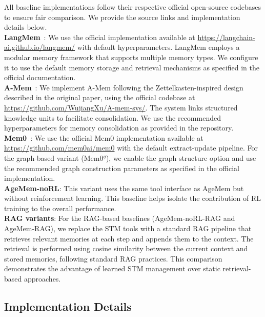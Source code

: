All baseline implementations follow their respective official open-source codebases to ensure fair comparison. We provide the source links and implementation details below.
\\
\textbf{LangMem}~\citep{langmem2025}: We use the official implementation available at \url{https://langchain-ai.github.io/langmem/} with default hyperparameters. LangMem employs a modular memory framework that supports multiple memory types. We configure it to use the default memory storage and retrieval mechanisms as specified in the official documentation.
\\
\textbf{A-Mem}~\citep{xu2025mem}: We implement A-Mem following the Zettelkasten-inspired design described in the original paper, using the official codebase at \url{https://github.com/WujiangXu/A-mem-sys/}. The system links structured knowledge units to facilitate consolidation. We use the recommended hyperparameters for memory consolidation as provided in the repository.
\\
\textbf{Mem0}~\citep{chhikara2025mem0}: We use the official Mem0 implementation available at \url{https://github.com/mem0ai/mem0} with the default extract-update pipeline. For the graph-based variant (Mem0$^g$), we enable the graph structure option and use the recommended graph construction parameters as specified in the official implementation.
\\
\textbf{AgeMem-noRL}: This variant uses the same tool interface as AgeMem but without reinforcement learning. This baseline helps isolate the contribution of RL training to the overall performance.
\\
\textbf{RAG variants}: For the RAG-based baselines (AgeMem-noRL-RAG and AgeMem-RAG), we replace the STM tools with a standard RAG pipeline that retrieves relevant memories at each step and appends them to the context. The retrieval is performed using cosine similarity between the current context and stored memories, following standard RAG practices. This comparison demonstrates the advantage of learned STM management over static retrieval-based approaches.

\subsection{Implementation Details}
\label{app:implementation}

